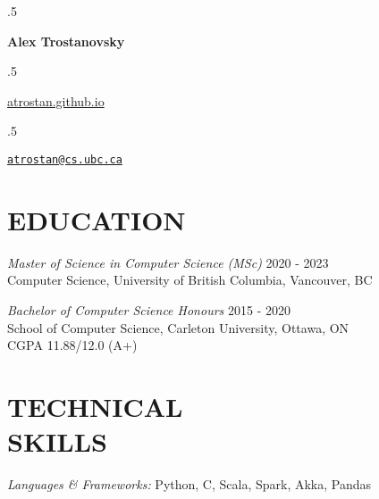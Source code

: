\documentclass[margin]{res}
\newcommand{\CC}{C\nolinebreak\hspace{-.05em}\raisebox{.4ex}{\tiny\bf +}\nolinebreak\hspace{-.10em}\raisebox{.4ex}{\tiny\bf +}}
\begin{document}
\moveleft.5\hoffset\centerline{\large\bf Alex Trostanovsky}
\moveleft.5\hoffset\centerline{
      {\href{https://atrostan.github.io/}{\textsf{atrostan.github.io}}}
      \textbullet{}
      \textbullet{}}

\moveleft.5\hoffset\centerline{
      { \tt \href{mailto:atrostan@cs.ubc.ca}{atrostan@cs.ubc.ca}}}
\begin{resume}
      
      
      \section{EDUCATION}
       
       {\sl Master of Science in Computer Science (MSc)}  \hfill 2020 - 2023 \\
      Computer Science, University of British Columbia, Vancouver, BC
      
            {\sl Bachelor of Computer Science Honours}  \hfill 2015 - 2020\\
      School of Computer Science, Carleton University, Ottawa, ON \\
      CGPA 11.88/12.0 (A+)\\
      
      \section{TECHNICAL \\ SKILLS} {\sl Languages \& Frameworks:} Python, \CC, Scala, Spark, Akka, 
      Pandas 
      

\end{resume}
\end{document}
